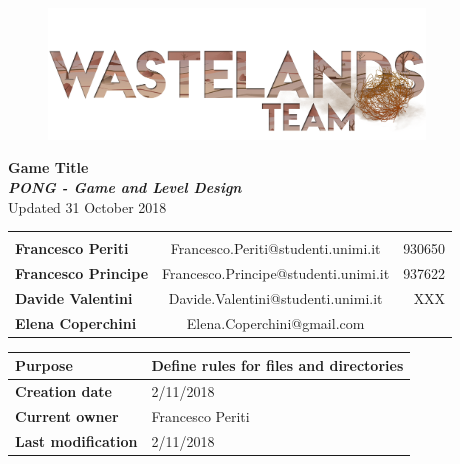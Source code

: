 \documentclass[12pt]{article}
\begin{document}
\begin{center}
  \begin{figure}
    \centering
  \vspace*{5\baselineskip}
  \includegraphics[width=10cm]{Documents/Images/logoTeam}
  \end{figure}

  {\large \textbf{Game Title}} \\
  \textbf{\textit{PONG - Game and Level Design}} \\
  {\small Updated 31 October 2018} \\

  \begin{tabular}{lcr}\\\\
\textbf{Francesco Periti}    & Francesco.Periti@studenti.unimi.it   & 930650\\
\textbf{Francesco Principe}  & Francesco.Principe@studenti.unimi.it & 937622\\
\textbf{Davide Valentini}    & Davide.Valentini@studenti.unimi.it   & XXX\\
\textbf{Elena Coperchini}   & Elena.Coperchini@gmail.com &\\
\end{tabular}


  \begin{table}[]
    
  \begin{tabular}{|l|l||}
    \hline
    \cellcolor{gray}\textbf{Purpose} &  Define rules for files and directories \\\hline
    \cellcolor{gray}\textbf{Creation date} & 2/11/2018 \\\hline
    \cellcolor{gray}\textbf{Current owner} & Francesco Periti \\\hline
    \cellcolor{gray}\textbf{Last modification} & 2/11/2018\\   \hline
  \end{tabular}
\end{table}


\end{center}
\end{document}
